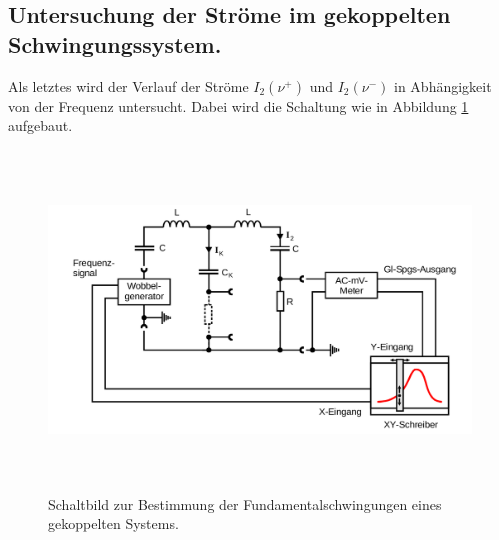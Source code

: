 \subsection{Untersuchung der Ströme im gekoppelten Schwingungssystem.} 
\label{sub:Untersuchung der Ströme im gekoppelten Schwingungssystem.}

Als letztes wird der Verlauf der Ströme $I_2(\nu^+)$ und $I_2(\nu^-)$ in Abhängigkeit von der Frequenz untersucht.
Dabei wird die Schaltung wie in Abbildung \ref{fig:bild8} aufgebaut.

\begin{figure}

    \centering
    \includegraphics[height=9.0cm]{data/Bild8.png}
    \caption{Schaltbild zur Bestimmung der Fundamentalschwingungen eines gekoppelten Systems.}
    \label{fig:bild8}
\end{figure}





